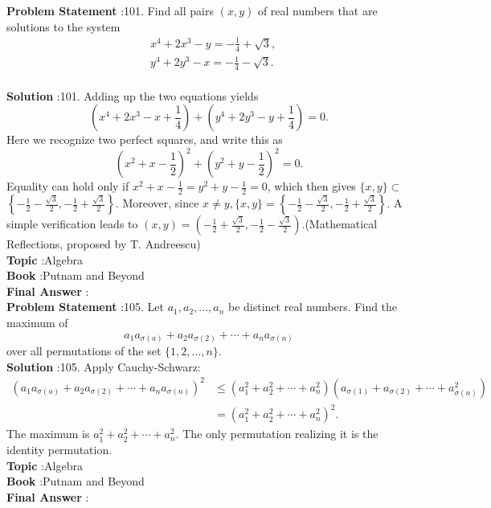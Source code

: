 \documentclass[10pt]{article}
\begin{document}
\textbf{Problem Statement} :101. Find all pairs $(x, y)$ of real numbers that are solutions to the system$$ \begin{aligned} &x^{4}+2 x^{3}-y=-\frac{1}{4}+\sqrt{3}, \\ &y^{4}+2 y^{3}-x=-\frac{1}{4}-\sqrt{3} . \end{aligned} $$\\
\textbf{Solution} :101. Adding up the two equations yields$$ \left(x^{4}+2 x^{3}-x+\frac{1}{4}\right)+\left(y^{4}+2 y^{3}-y+\frac{1}{4}\right)=0 . $$Here we recognize two perfect squares, and write this as$$ \left(x^{2}+x-\frac{1}{2}\right)^{2}+\left(y^{2}+y-\frac{1}{2}\right)^{2}=0 . $$Equality can hold only if $x^{2}+x-\frac{1}{2}=y^{2}+y-\frac{1}{2}=0$, which then gives $\{x, y\} \subset$ $\left\{-\frac{1}{2}-\frac{\sqrt{3}}{2},-\frac{1}{2}+\frac{\sqrt{3}}{2}\right\}$. Moreover, since $x \neq y,\{x, y\}=\left\{-\frac{1}{2}-\frac{\sqrt{3}}{2},-\frac{1}{2}+\frac{\sqrt{3}}{2}\right\}$. A simple verification leads to $(x, y)=\left(-\frac{1}{2}+\frac{\sqrt{3}}{2},-\frac{1}{2}-\frac{\sqrt{3}}{2}\right)$.(Mathematical Reflections, proposed by T. Andreescu)\\
\textbf{Topic} :Algebra\\
\textbf{Book} :Putnam and Beyond\\
\textbf{Final Answer} :\\


\textbf{Problem Statement} :105. Let $a_{1}, a_{2}, \ldots, a_{n}$ be distinct real numbers. Find the maximum of$$ a_{1} a_{\sigma(a)}+a_{2} a_{\sigma(2)}+\cdots+a_{n} a_{\sigma(n)} $$over all permutations of the set $\{1,2, \ldots, n\}$.\\
\textbf{Solution} :105. Apply Cauchy-Schwarz:$$ \begin{aligned} \left(a_{1} a_{\sigma(a)}+a_{2} a_{\sigma(2)}+\cdots+a_{n} a_{\sigma(n)}\right)^{2} & \leq\left(a_{1}^{2}+a_{2}^{2}+\cdots+a_{n}^{2}\right)\left(a_{\sigma(1)}+a_{\sigma(2)}+\cdots+a_{\sigma(n)}^{2}\right) \\ &=\left(a_{1}^{2}+a_{2}^{2}+\cdots+a_{n}^{2}\right)^{2} . \end{aligned} $$The maximum is $a_{1}^{2}+a_{2}^{2}+\cdots+a_{n}^{2}$. The only permutation realizing it is the identity permutation.\\
\textbf{Topic} :Algebra\\
\textbf{Book} :Putnam and Beyond\\
\textbf{Final Answer} :\\
\end{document}
